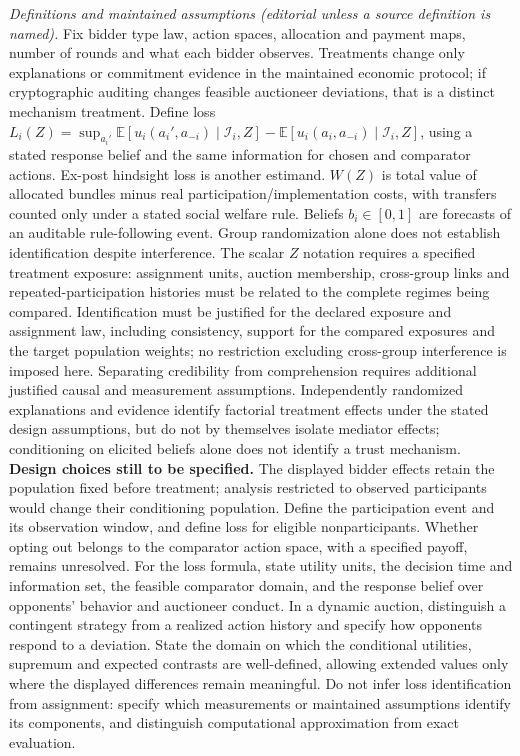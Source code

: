 \documentclass[11pt,a4paper]{article}
\begin{document}
\emph{Definitions and maintained assumptions (editorial unless a source definition is named).} Fix bidder type law, action spaces, allocation and payment maps, number of rounds and what each bidder observes. Treatments change only explanations or commitment evidence in the maintained economic protocol; if cryptographic auditing changes feasible auctioneer deviations, that is a distinct mechanism treatment. Define loss \(L_i(Z)=\sup_{a_i'}\mathbb E[u_i(a_i',a_{-i})\mid\mathcal I_i,Z]-\mathbb E[u_i(a_i,a_{-i})\mid\mathcal I_i,Z]\), using a stated response belief and the same information for chosen and comparator actions. Ex-post hindsight loss is another estimand. \(W(Z)\) is total value of allocated bundles minus real participation/implementation costs, with transfers counted only under a stated social welfare rule. Beliefs \(b_i\in[0,1]\) are forecasts of an auditable rule-following event. Group randomization alone does not establish identification despite interference. The scalar \(Z\) notation requires a specified treatment exposure: assignment units, auction membership, cross-group links and repeated-participation histories must be related to the complete regimes being compared. Identification must be justified for the declared exposure and assignment law, including consistency, support for the compared exposures and the target population weights; no restriction excluding cross-group interference is imposed here. Separating credibility from comprehension requires additional justified causal and measurement assumptions. Independently randomized explanations and evidence identify factorial treatment effects under the stated design assumptions, but do not by themselves isolate mediator effects; conditioning on elicited beliefs alone does not identify a trust mechanism.
\textbf{Design choices still to be specified.} The displayed bidder effects retain the population fixed before treatment; analysis restricted to observed participants would change their conditioning population. Define the participation event and its observation window, and define loss for eligible nonparticipants. Whether opting out belongs to the comparator action space, with a specified payoff, remains unresolved. For the loss formula, state utility units, the decision time and information set, the feasible comparator domain, and the response belief over opponents' behavior and auctioneer conduct. In a dynamic auction, distinguish a contingent strategy from a realized action history and specify how opponents respond to a deviation. State the domain on which the conditional utilities, supremum and expected contrasts are well-defined, allowing extended values only where the displayed differences remain meaningful. Do not infer loss identification from assignment: specify which measurements or maintained assumptions identify its components, and distinguish computational approximation from exact evaluation.
\end{document}
